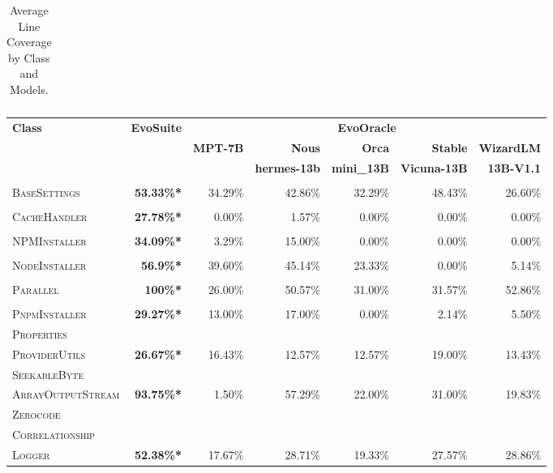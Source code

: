 \begin{table}[H]
\begin{tabular}{| l | r | r | r | r | r | r |}
\end{tabular}
\caption{Average Line Coverage by Class and Models.}
\label{tab:line_coverage}
\end{table}

\begin{table}[H]
\centering

\begin{tabular}{| l | r | r | r | r | r | r |}
\hline
\multirow{2}{*}{\textbf{Class}} & \multirow{2}{*}{\textbf{EvoSuite}} & \multicolumn{5}{c|}{\textbf{EvoOracle}} \\ %
\cline{3-7} %
 &  & \textbf{MPT-7B} & \textbf{Nous} & \textbf{Orca} & \textbf{Stable} & \textbf{WizardLM} \\
 &  &  & \textbf{hermes-13b} & \textbf{mini\_13B} & \textbf{Vicuna-13B} & \textbf{13B-V1.1} \\
\hline
\scriptsize\textsc{} &  &  &  &  &  &  \\
\scriptsize\textsc{BaseSettings} & \textbf{53.33\%*} & 34.29\% & 42.86\% & 32.29\% & 48.43\% & 26.60\% \\
\hline
\scriptsize\textsc{} &  &  &  &  &  &  \\
\scriptsize\textsc{CacheHandler} & \textbf{27.78\%*} & 0.00\% & 1.57\% & 0.00\% & 0.00\% & 0.00\% \\
\hline
\scriptsize\textsc{} &  &  &  &  &  &  \\
\scriptsize\textsc{NPMInstaller} & \textbf{34.09\%*} & 3.29\% & 15.00\% & 0.00\% & 0.00\% & 0.00\% \\
\hline
\scriptsize\textsc{} &  &  &  &  &  &  \\
\scriptsize\textsc{NodeInstaller} & \textbf{56.9\%*} & 39.60\% & 45.14\% & 23.33\% & 0.00\% & 5.14\% \\
\hline
\scriptsize\textsc{} &  &  &  &  &  &  \\
\scriptsize\textsc{Parallel} & \textbf{100\%*} & 26.00\% & 50.57\% & 31.00\% & 31.57\% & 52.86\% \\
\hline
\scriptsize\textsc{} &  &  &  &  &  &  \\
\scriptsize\textsc{PnpmInstaller} & \textbf{29.27\%*} & 13.00\% & 17.00\% & 0.00\% & 2.14\% & 5.50\% \\
\hline
\scriptsize\textsc{Properties} &  &  &  &  &  &  \\
\scriptsize\textsc{ProviderUtils} & \textbf{26.67\%*} & 16.43\% & 12.57\% & 12.57\% & 19.00\% & 13.43\% \\
\hline
\scriptsize\textsc{SeekableByte} &  &  &  &  &  &  \\
\scriptsize\textsc{ArrayOutputStream} & \textbf{93.75\%*} & 1.50\% & 57.29\% & 22.00\% & 31.00\% & 19.83\% \\
\hline
\scriptsize\textsc{Zerocode} &  &  &  &  &  &  \\
\scriptsize\textsc{Correlationship} &  &  &  &  &  &  \\
\scriptsize\textsc{Logger} & \textbf{52.38\%*} & 17.67\% & 28.71\% & 19.33\% & 27.57\% & 28.86\% \\
\hline


\end{tabular}
\end{table}
